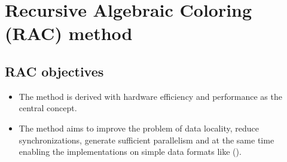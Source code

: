 \section{Recursive Algebraic Coloring (RAC) method}
\subsection{RAC objectives}
\begin{itemize}
	\item The method is derived with hardware efficiency and performance as the central concept.
	\item The method aims to improve the problem of data locality, reduce synchronizations, generate sufficient parallelism and at the same time enabling the implementations on simple data formats like \CRSfull (\CRS).
\end{itemize}
